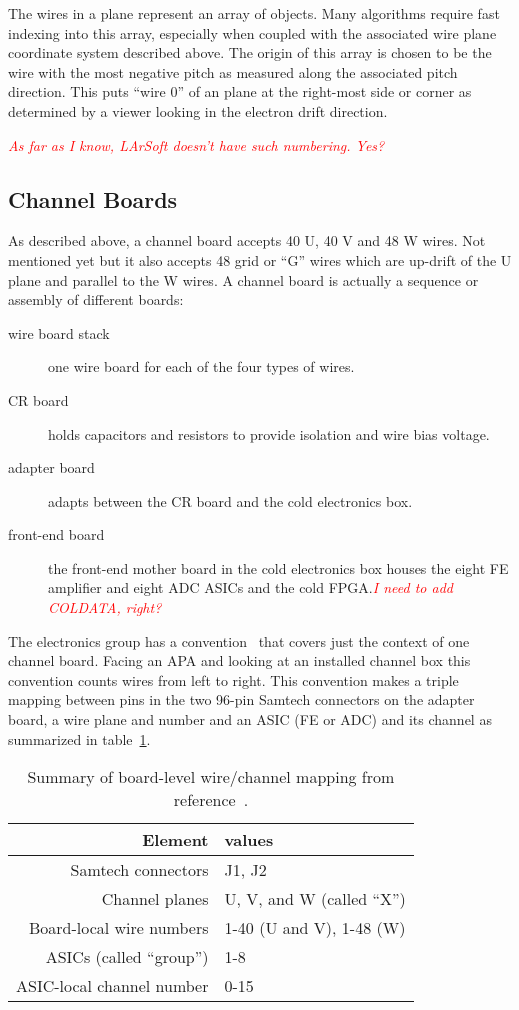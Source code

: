 \documentclass[letterpaper,twoside,onecolumn,article]{memoir}
\newcommand{\fixme}[1]{\textcolor{red}{\textit{#1}}}
\begin{document}
The wires in a plane represent an array of objects.  Many algorithms
require fast indexing into this array, especially when coupled with
the associated wire plane coordinate system described above.  The
origin of this array is chosen to be the wire with the most negative
pitch as measured along the associated pitch direction.  This puts
``wire 0'' of an plane at the right-most side or corner as determined
by a viewer looking in the electron drift direction.

\fixme{As far as I know, LArSoft doesn't have such numbering.  Yes?}

\subsection{Channel Boards}

As described above, a channel board accepts 40 U, 40 V and 48 W wires.
Not mentioned yet but it also accepts 48 grid or ``G'' wires which are
up-drift of the U plane and parallel to the W wires.  A channel board
is actually a sequence or assembly of different boards:

\begin{description}
\item[wire board stack] one wire board for each of the four types of wires.
\item[CR board] holds capacitors and resistors to provide isolation and wire bias voltage.
\item[adapter board] adapts between the CR board and the cold electronics box.
\item[front-end board] the front-end mother board in the cold
  electronics box houses the eight FE amplifier and eight ADC ASICs
  and the cold FPGA.\fixme{I need to add COLDATA, right?}
\end{description}

The electronics group has a convention~\cite{docdb2060} that covers
just the context of one channel board.  Facing an APA and looking at
an installed channel box this convention counts wires from left to
right.  This convention makes a triple mapping between pins in the two
96-pin Samtech connectors on the adapter board, a wire plane
and number and an ASIC (FE or ADC) and its channel as summarized in
table~\ref{tab:board-wire-chan}.

\begin{table}[h]
  \centering
  \begin{tabular}[h]{|r|l|}
    \hline
    Element & values \\
    \hline
    Samtech connectors & J1, J2 \\
    Channel planes & U, V, and W (called ``X'') \\
    Board-local wire numbers & 1-40 (U and V), 1-48 (W) \\
    ASICs (called ``group'') & 1-8 \\
    ASIC-local channel number & 0-15 \\
    \hline
  \end{tabular}
  \caption{Summary of board-level wire/channel mapping from reference~\cite{docdb2060}.}
  \label{tab:board-wire-chan}
\end{table}
\end{document}
